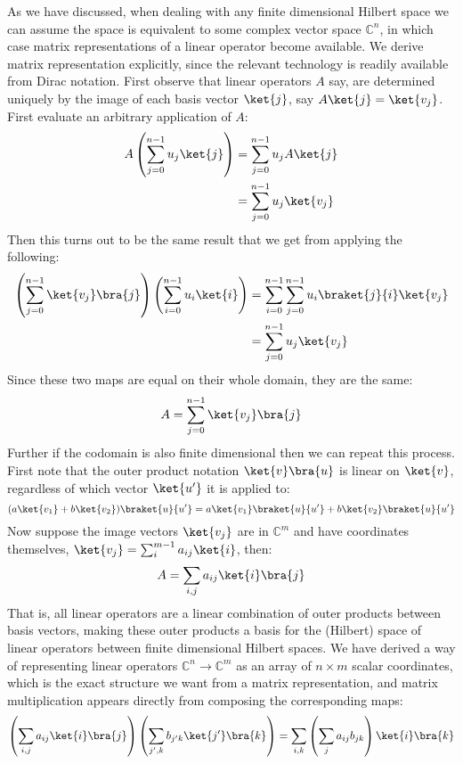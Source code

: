 As we have discussed, when dealing with any finite dimensional Hilbert space we can assume the space is equivalent to some complex vector space $\mathbb{C}^n$, in which case matrix representations of a linear operator become available. We derive matrix representation explicitly, since the relevant technology is readily available from Dirac notation. First observe that linear operators $A$ say, are determined uniquely by the image of each basis vector $\ket{j}$, say $A\ket{j} = \ket{v_j}$. First evaluate an arbitrary application of $A$:
\begin{align*}
	A\left(\sum_{j=0}^{n-1}u_j\ket{j}\right)
	&= \sum_{j=0}^{n-1}u_jA\ket{j}
	\\&= \sum_{j=0}^{n-1}u_j\ket{v_j}
\end{align*}
Then this turns out to be the same result that we get from applying the following:
\begin{align*}
	\left(\sum_{j=0}^{n-1}\ket{v_j}\bra{j}\right)\left(\sum_{i=0}^{n-1}u_i\ket{i}\right)
	&= \sum_{i=0}^{n-1}\sum_{j=0}^{n-1}u_i\braket{j}{i}\ket{v_j}
	\\&= \sum_{j=0}^{n-1}u_j\ket{v_j}
\end{align*}
Since these two maps are equal on their whole domain, they are the same:
\[A = \sum_{j=0}^{n-1} \ket{v_j}\bra{j}\]
Further if the codomain is also finite dimensional then we can repeat this process. First note that the outer product notation $\ket{v}\bra{u}$ is linear on $\ket{v}$, regardless of which vector $\ket{u'}$ it is applied to:
\[(a\ket{v_1}+b\ket{v_2})\braket{u}{u'} = a\ket{v_1}\braket{u}{u'}+b\ket{v_2}\braket{u}{u'}\]
Now suppose the image vectors $\ket{v_j}$ are in $\mathbb{C}^m$ and have coordinates themselves, $\ket{v_j} = \sum_i^{m-1} a_{ij}\ket{i}$, then:
\begin{align*}
	A = \sum_{i,j} a_{ij}\ket{i}\bra{j}
\end{align*}
That is, all linear operators are a linear combination of outer products between basis vectors, making these outer products a basis for the (Hilbert) space of linear operators between finite dimensional Hilbert spaces. We have derived a way of representing linear operators $\mathbb{C}^n \to \mathbb{C}^m$ as an array of $n \times m$ scalar coordinates, which is the exact structure we want from a matrix representation, and matrix multiplication appears directly from composing the corresponding maps:
\[\left(\sum_{i,j}a_{ij}\ket{i}\bra{j}\right)\left(\sum_{j',k}b_{j'k}\ket{j'}\bra{k}\right) = \sum_{i,k}\left(\sum_j a_{ij}b_{jk}\right)\ket{i}\bra{k}\]

